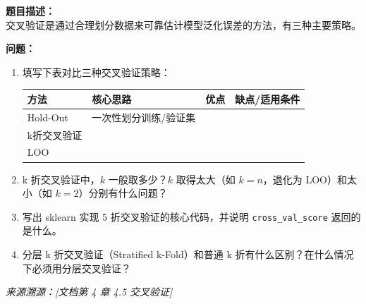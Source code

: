 \documentclass[a4paper,11pt]{ctexart}
\begin{document}
\begin{problembox}
    \textbf{题目描述：}\\
    交叉验证是通过合理划分数据来可靠估计模型泛化误差的方法，有三种主要策略。

    \vspace{0.2cm}
    \textbf{问题：}
    \begin{enumerate}[(1)]
        \item 填写下表对比三种交叉验证策略：
        \begin{center}
        \begin{tabular}{p{2.5cm} p{3cm} p{3.5cm} p{3.5cm}}
            \toprule
            方法 & 核心思路 & 优点 & 缺点/适用条件 \\
            \midrule
            Hold-Out & 一次性划分训练/验证集 & \underline{\hspace{2.5cm}} & \underline{\hspace{3cm}} \\[1.2em]
            k折交叉验证 & \underline{\hspace{2.5cm}} & \underline{\hspace{2.5cm}} & \underline{\hspace{3cm}} \\[1.2em]
            LOO & \underline{\hspace{2.5cm}} & \underline{\hspace{2.5cm}} & \underline{\hspace{3cm}} \\
            \bottomrule
        \end{tabular}
        \end{center}

        \item k 折交叉验证中，$k$ 一般取多少？$k$ 取得太大（如 $k=n$，退化为 LOO）和太小（如 $k=2$）分别有什么问题？

        \item 写出 sklearn 实现 5 折交叉验证的核心代码，并说明 \texttt{cross\_val\_score} 返回的是什么。

        \item 分层 k 折交叉验证（Stratified k-Fold）和普通 k 折有什么区别？在什么情况下必须用分层交叉验证？
    \end{enumerate}
    {\color{gray}\small\textit{来源溯源：[文档第 4 章 4.5 交叉验证]}}
\end{problembox}
\end{document}
